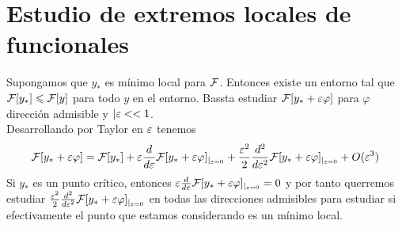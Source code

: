 \section{Estudio de extremos locales de funcionales}

Supongamos que $y_*$ es mínimo local para $\mathcal{F}$. Entonces existe un entorno tal que $\mathcal{F}[y_*] \leqslant \mathcal{F}[y]$ para todo $y$ en el entorno. Bassta estudiar $\mathcal{F}[y_*+\varepsilon\varphi]$ para $\varphi$ dirección admisible y $|\varepsilon << 1$. \\

Desarrollando por Taylor en $\varepsilon$ tenemos 
\begin{gather*}
    \mathcal{F}[y_*+\varepsilon\varphi] = \mathcal{F}[y_*] + \varepsilon \frac{d}{d\varepsilon} \mathcal{F}[y_*+\varepsilon\varphi]_{|_{\varepsilon=0}} + \frac{\varepsilon^2}{2} \frac{d^2}{d\varepsilon^2}\mathcal{F}[y_*+\varepsilon\varphi]_{|_{\varepsilon=0}} + O(\varepsilon^3) 
\end{gather*}
Si $y_*$ es un punto crítico, entonces $\varepsilon \frac{d}{d\varepsilon} \mathcal{F}[y_*+\varepsilon\varphi]_{|_{\varepsilon=0}} = 0$ y por tanto querremos estudiar $\frac{\varepsilon^2}{2} \frac{d^2}{d\varepsilon^2}\mathcal{F}[y_*+\varepsilon\varphi]_{|_{\varepsilon=0}}$ en todas las direcciones admisibles para estudiar si efectivamente el punto que estamos considerando es un mínimo local.
